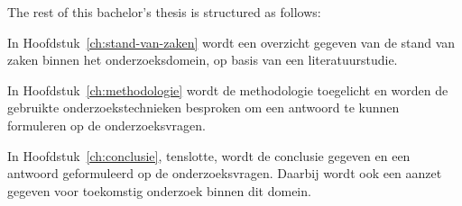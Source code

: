 
The rest of this bachelor's thesis is structured as follows:

In Hoofdstuk~\ref{ch:stand-van-zaken} wordt een overzicht gegeven van de stand van zaken binnen het onderzoeksdomein, op basis van een literatuurstudie.

In Hoofdstuk~\ref{ch:methodologie} wordt de methodologie toegelicht en worden de gebruikte onderzoekstechnieken besproken om een antwoord te kunnen formuleren op de onderzoeksvragen.


In Hoofdstuk~\ref{ch:conclusie}, tenslotte, wordt de conclusie gegeven en een antwoord geformuleerd op de onderzoeksvragen. Daarbij wordt ook een aanzet gegeven voor toekomstig onderzoek binnen dit domein.
